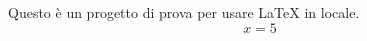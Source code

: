 \documentclass{article}
\begin{document}
Questo è un progetto di prova per usare LaTeX in locale.
	\begin{equation}
		x = 5
	\end{equation}
\end{document}

